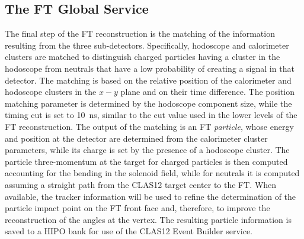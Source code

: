 \subsection{The FT Global Service}

The final step of the FT reconstruction is the matching of the information resulting from the three sub-detectors.
Specifically, hodoscope and calorimeter clusters are matched to distinguish charged particles having a cluster in the
hodoscope from neutrals that have a low probability of creating a signal in that detector. The matching is based on
the relative position of the calorimeter and hodoscope clusters in the $x-y$ plane and on their time difference. The
position matching parameter is determined by the hodoscope component size, while the timing cut is set to 10~ns,
similar to the cut value used in the lower levels of the FT reconstruction. The output of the matching is an FT
{\it particle}, whose energy and position at the detector are determined from the calorimeter cluster parameters,
while its charge is set by the presence of a hodoscope cluster. The particle three-momentum at the target for charged
particles is then computed accounting for the bending in the solenoid field, while for neutrals it is computed assuming
a straight path from the CLAS12 target center to the FT. When available, the tracker information will be used to
refine the determination of the particle impact point on the FT front face and, therefore, to improve the
reconstruction of the angles at the vertex. The resulting particle information is saved to a HIPO bank for use of
the CLAS12 Event Builder service.
